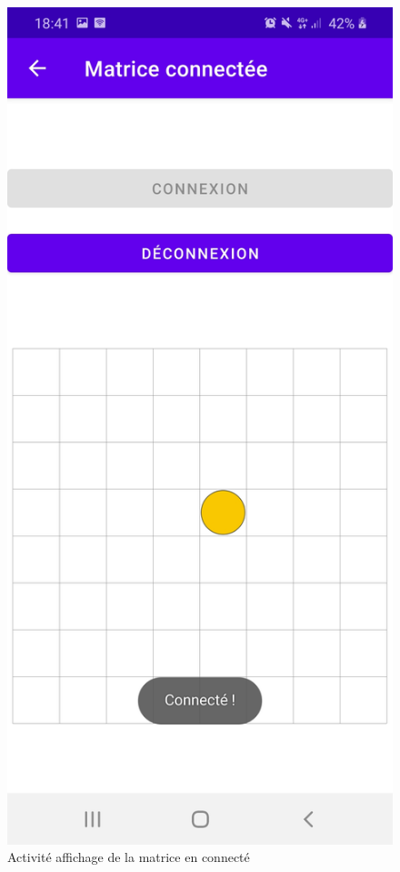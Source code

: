 \documentclass[a4paper,12pt]{report}
\begin{document}
		\begin{figure}[H]
			\centering
				\includegraphics[scale=0.2]{images/matco.jpg}
				\caption{Activité affichage de la matrice en connecté}
		\end{figure}
		
\end{document}
